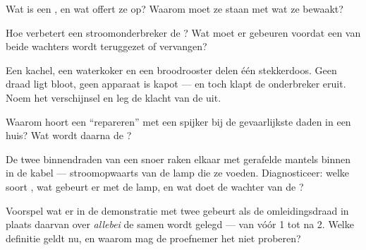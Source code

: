 \begin{exercise}[$\star$]\label{exo:g7:short-circuits-safety:5}
Wat is een , en wat offert ze op? Waarom moet ze
 staan met wat ze bewaakt?
\end{exercise}

\begin{exercise}[$\star$]\label{exo:g7:short-circuits-safety:6}
Hoe verbetert een stroomonderbreker de ? Wat moet er
gebeuren voordat een van beide wachters wordt teruggezet of vervangen?
\end{exercise}

\begin{exercise}[$\star$]\label{exo:g7:short-circuits-safety:7}
Een kachel, een waterkoker en een broodrooster delen één stekkerdoos.
Geen draad ligt bloot, geen apparaat is kapot --- en toch klapt de
onderbreker eruit. Noem het verschijnsel en leg de klacht van de
 uit.
\end{exercise}

\begin{exercise}[$\star$]\label{exo:g7:short-circuits-safety:8}
Waarom hoort een  ``repareren'' met een spijker bij de
gevaarlijkste daden in een huis? Wat wordt daarna de ?
\end{exercise}

\begin{exercise}[$\star\star$]\label{exo:g7:short-circuits-safety:9}
De twee binnendraden van een snoer raken elkaar met gerafelde mantels
binnen in de kabel --- stroomopwaarts van de lamp die ze voeden.
Diagnosticeer: welke soort , wat gebeurt er met de lamp,
en wat doet de wachter van de ?
\end{exercise}

\begin{exercise}[$\star\star$]\label{exo:g7:short-circuits-safety:10}
Voorspel wat er in de demonstratie met twee  gebeurt als de
omleidingsdraad in plaats daarvan over \emph{allebei} de
 samen wordt gelegd --- van vóór  1 tot na
 2. Welke definitie geldt nu, en waarom mag de proefnemer het
niet proberen?
\end{exercise}


